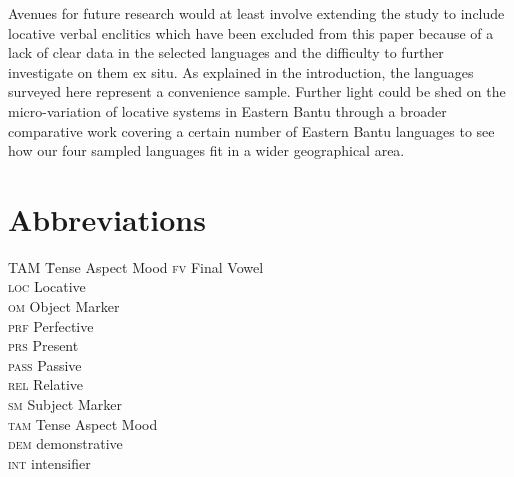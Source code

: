 \documentclass[output=paper ]{langscibook}
\begin{document}
Avenues for future research would at least involve extending the study to include locative verbal enclitics which have been excluded from this paper because of a lack of clear data in the selected languages and the difficulty to further investigate on them ex situ. As explained in the introduction, the languages surveyed here represent a convenience sample. Further light could be shed on the micro-variation of locative systems in Eastern Bantu through a broader comparative work covering a certain number of Eastern Bantu languages to see how our four sampled languages fit in a wider geographical area. 


\section*{Abbreviations}
\begin{multicols}{2}
\begin{tabbing}
TAM \= Tense Aspect Mood\kill
\textsc{fv} \> Final Vowel\\
\textsc{loc} \> Locative\\
\textsc{om} \> Object Marker\\
\textsc{prf} \> Perfective\\
\textsc{prs} \> Present\\
\textsc{pass} \> Passive\\
\textsc{rel} \> Relative\\
\textsc{sm} \> Subject Marker\\
\textsc{tam} \> Tense Aspect Mood\\
\textsc{dem} \> demonstrative\\
\textsc{int} \> intensifier\\
\end{tabbing}
\end{multicols}

\sloppy\printbibliography[heading=subbibliography,notkeyword=this]
\end{document}
